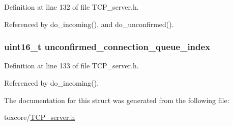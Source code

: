 Definition at line 132 of file T\+C\+P\+\_\+server.\+h.



Referenced by do\+\_\+incoming(), and do\+\_\+unconfirmed().

\hypertarget{struct_t_c_p___server_a86567f857493f585eb843963350a9f0b}{
\subsubsection[{unconfirmed\+\_\+connection\+\_\+queue\+\_\+index}]{\setlength{\rightskip}{0pt plus 5cm}uint16\+\_\+t unconfirmed\+\_\+connection\+\_\+queue\+\_\+index}}\label{struct_t_c_p___server_a86567f857493f585eb843963350a9f0b}


Definition at line 133 of file T\+C\+P\+\_\+server.\+h.



Referenced by do\+\_\+incoming().



The documentation for this struct was generated from the following file\+:\begin{DoxyCompactItemize}
\item 
toxcore/\hyperlink{_t_c_p__server_8h}{T\+C\+P\+\_\+server.\+h}\end{DoxyCompactItemize}
